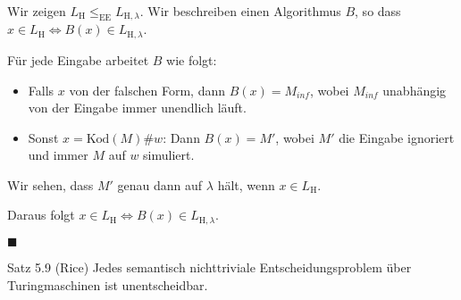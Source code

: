     Wir zeigen $L_\text{H} \leq_\text{EE} L_{\text{H}, \lambda}$. Wir beschreiben einen Algorithmus $B$, so dass $x \in L_\text{H} \iff B(x) \in L_{\text{H}, \lambda}$.

    Für jede Eingabe arbeitet $B$ wie folgt:
    \begin{itemize}
        \item Falls $x$ von der falschen Form, dann $B(x) = M_{inf}$, wobei $M_{inf}$ unabhängig von der Eingabe immer unendlich läuft.
        \item Sonst $x = \text{Kod}(M)\#w$: Dann $B(x) = M'$, wobei $M'$ die Eingabe ignoriert und immer $M$ auf $w$ simuliert.
    \end{itemize}

    Wir sehen, dass $M'$ genau dann auf $\lambda$ hält, wenn $x \in L_{\text{H}}$.

    Daraus folgt $x \in L_\text{H} \iff B(x) \in L_{\text{H}, \lambda}$.

    \hspace*{0pt}\hfill$\blacksquare$

    \begin{mainbox}{Satz 5.9 (Rice)}
        Jedes semantisch nichttriviale Entscheidungsproblem über Turingmaschinen ist unentscheidbar.
    \end{mainbox}
    


